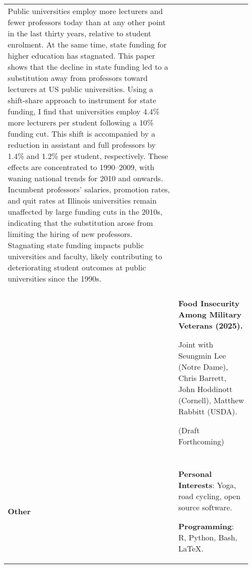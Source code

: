 \documentclass[letterpaper,11pt,oneside]{article}
\begin{document}
\begin{longtable}[\textwidth]{p{} p{}}
    Public universities employ more lecturers and fewer professors today than at any other point in the last thirty years, relative to student enrolment.
    At the same time, state funding for higher education has stagnated.
    This paper shows that the decline in state funding led to a substitution away from professors toward lecturers at US public universities.
    Using a shift-share approach to instrument for state funding, I find that universities employ 4.4\% more lecturers per student following a 10\% funding cut.
    This shift is accompanied by a reduction in assistant and full professors by 1.4\% and 1.2\%  per student, respectively.
    These effects are concentrated to 1990--2009, with waning national trends for 2010 and onwards.
    Incumbent professors' salaries, promotion rates, and quit rates at Illinois universities remain unaffected by large funding cuts in the 2010s, indicating that the substitution arose from limiting the hiring of new professors.
    Stagnating state funding impacts public universities and faculty, likely contributing to deteriorating student outcomes at public universities since the 1990s. \\ \\

    & \textbf{Food Insecurity Among Military Veterans (2025).}

    Joint with Seungmin Lee (Notre Dame), Chris Barrett, John Hoddinott (Cornell), Matthew Rabbitt (USDA).

    (Draft Forthcoming) \\ \\

%

    \vfill \textbf{Other}
    & \vfill \textbf{Personal Interests}: Yoga, road cycling, open source software.
    
    \textbf{Programming}: R, Python, Bash, \LaTeX.
\end{longtable}
\end{document}
